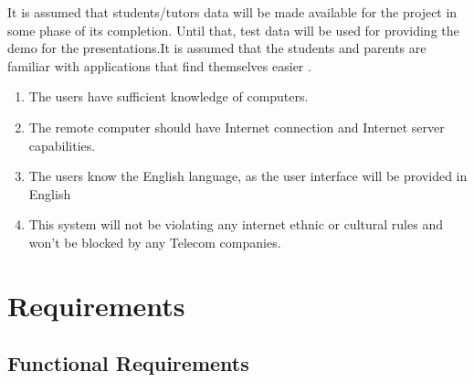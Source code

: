 It is assumed that students/tutors data will be made available for the project in some phase of its completion. Until that, test data will be used for providing the demo for the presentations.It is assumed that the students and parents are familiar with applications that find themselves easier .

\begin{enumerate}
\item The users have sufficient knowledge of computers.
\item The remote computer should have Internet connection and Internet server capabilities.
\item The users know the English language, as the user interface will be provided in English
\item This system will not be violating any internet ethnic or cultural rules and won’t be blocked by any Telecom companies.
\end{enumerate}


\newpage




\chapter{Requirements}
\label{Requirements}


\section{Functional Requirements}

